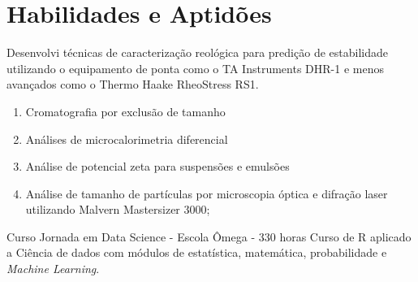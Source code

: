 \section{Habilidades e Aptidões}

{Desenvolvi técnicas de caracterização reológica para 
predição de estabilidade utilizando o 
equipamento de ponta como o TA Instruments DHR-1 e 
menos avançados como o Thermo Haake RheoStress RS1.}\hfill
{}\hfill

\hfill
{}


{
    \begin{enumerate}
        \item Cromatografia por exclusão de tamanho
        \item Análises de microcalorimetria diferencial
        \item Análise de potencial zeta para suspensões e emulsões
        \item Análise de tamanho de partículas por microscopia óptica e difração laser utilizando Malvern Mastersizer 3000;
    \end{enumerate}
    }\hfill
{}
    
\skill
{Curso}
{Jornada em Data Science - Escola Ômega - 330 horas}
{
Curso de R aplicado a Ciência de dados com módulos de
estatística, matemática, probabilidade e \emph{Machine Learning}.
}
